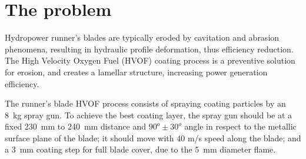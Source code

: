 \section{The problem}



Hydropower runner's blades are typically eroded by cavitation and abrasion
phenomena, resulting in hydraulic profile deformation, thus efficiency
reduction. The High Velocity Oxygen Fuel (HVOF) coating process is a preventive
solution for erosion, and creates a lamellar structure, increasing
power generation efficiency. 

The runner's blade HVOF process consists of spraying coating particles by an
8~kg spray gun. To achieve the best coating layer, the spray gun should be at a
fixed 230~mm to 240~mm distance and $90^o \pm 30^o$ angle in respect
to the metallic surface plane of the blade; it should move with 40 m/s speed
along the blade; and a 3~mm coating step for full blade cover, due to the 5~mm
diameter flame.

\begin{comment}
In the case of the Jirau hydroelectric dam, the coating of turbine's blades is
performed before turbine assembling and installation. However, the abrasion due
to a large number of particles and sediment in the Madeira river and the recent
identified cavitation require recoating in short intervals \citep{santa2009slurry}.
\end{comment}
